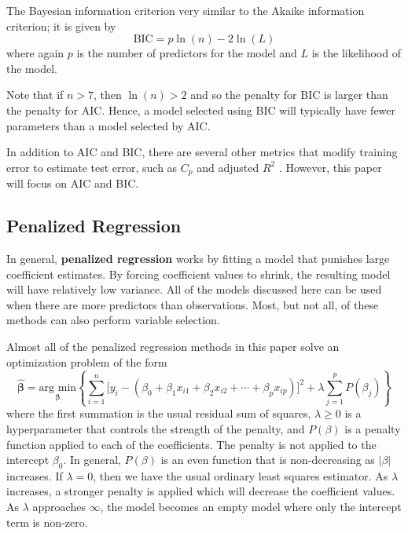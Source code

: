\documentclass{article}
\newcommand{\argmin}[2]{\underset{#1}{\text{arg min}}\left\{#2\right\}}
\begin{document}
	The Bayesian information criterion very similar to the Akaike information criterion; it is given by
	\begin{equation}
		\text{BIC} = p\ln(n) - 2\ln(L)
	\end{equation}
	where again $p$ is the number of predictors for the model and $L$ is the likelihood of the model.
	
	Note that if $n>7$, then $\ln(n)>2$ and so the penalty for BIC is larger than the penalty for AIC. Hence, a model selected using BIC will typically have fewer parameters than a model selected by AIC.
	
	In addition to AIC and BIC, there are several other metrics that modify training error to estimate test error, such as $C_p$ and adjusted $R^2$ \cite{james2013introduction}. However, this paper will focus on AIC and BIC.
	\subsection{Penalized Regression}
	
	In general, \textbf{penalized regression} works by fitting a model that punishes large coefficient estimates. By forcing coefficient values to shrink, the resulting model will have relatively low variance. All of the models discussed here can be used when there are more predictors than observations. Most, but not all, of these methods can also perform variable selection.
	
	Almost all of the penalized regression methods in this paper solve an optimization problem of the form
	\begin{equation}\label{eqn:penalized-regression-lambda}
		\hat{\bm{\beta}}=\argmin{\bm{\beta}}{\sum\limits_{i = 1}^n \Big[y_i - (\beta_0 + \beta_1 x_{i1} + \beta_2 x_{i2} + \cdots + \beta_p x_{ip})\Big]^2 + \lambda\sum\limits_{j = 1}^p P(\beta_j)}
	\end{equation}
	where the first summation is the usual residual sum of squares, $\lambda\geq 0$ is a hyperparameter that controls the strength of the penalty, and $P(\beta)$ is a penalty function applied to each of the coefficients. The penalty is not applied to the intercept $\beta_0$. In general, $P(\beta)$ is an even function that is non-decreasing as $\vert \beta \vert$ increases. If $\lambda = 0$, then we have the usual ordinary least squares estimator. As $\lambda$ increases, a stronger penalty is applied which will decrease the coefficient values. As $\lambda$ approaches $\infty$, the model becomes an empty model where only the intercept term is non-zero.
	
\end{document}
